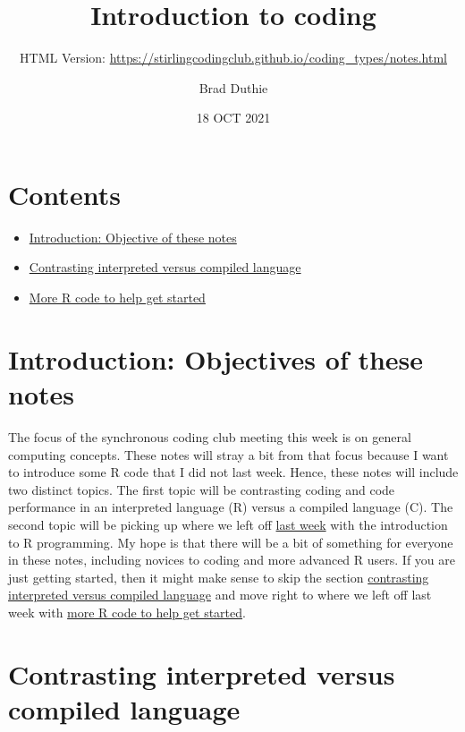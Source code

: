 \documentclass[
]{article}
\title{Introduction to coding}
\subtitle{HTML Version:
\url{https://stirlingcodingclub.github.io/coding_types/notes.html}}
\author{Brad Duthie}
\date{18 OCT 2021}
\providecommand{\tightlist}{%
  \setlength{\itemsep}{0pt}\setlength{\parskip}{0pt}}
\begin{document}
\maketitle

\hypertarget{contents}{%
\section{Contents}\label{contents}}

\begin{itemize}
\tightlist
\item
  \protect\hyperlink{intro}{Introduction: Objective of these notes}
\item
  \protect\hyperlink{contrast}{Contrasting interpreted versus compiled
  language}
\item
  \protect\hyperlink{Rcode}{More R code to help get started}
\end{itemize}

\hypertarget{introduction-objectives-of-these-notes}{%
\section{Introduction: Objectives of these
notes}\label{introduction-objectives-of-these-notes}}

The focus of the synchronous coding club meeting this week is on general
computing concepts. These notes will stray a bit from that focus because
I want to introduce some R code that I did not last week. Hence, these
notes will include two distinct topics. The first topic will be
contrasting coding and code performance in an interpreted language (R)
versus a compiled language (C). The second topic will be picking up
where we left off
\href{https://stirlingcodingclub.github.io/getting_started/notes.html}{last
week} with the introduction to R programming. My hope is that there will
be a bit of something for everyone in these notes, including novices to
coding and more advanced R users. If you are just getting started, then
it might make sense to skip the section
\protect\hyperlink{contrast}{contrasting interpreted versus compiled
language} and move right to where we left off last week with
\protect\hyperlink{Rcode}{more R code to help get started}.

\hypertarget{contrasting-interpreted-versus-compiled-language}{%
\section{Contrasting interpreted versus compiled
language}\label{contrasting-interpreted-versus-compiled-language}}
\end{document}
